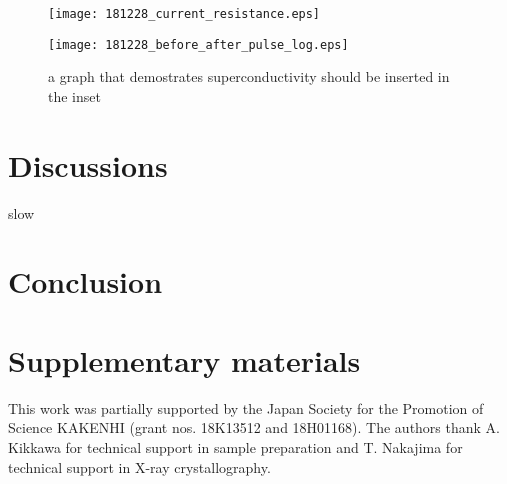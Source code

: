 \documentclass[aip,apl,reprint]{revtex4-1}
\begin{document}
\begin{figure}[!h]
    \begin{center}
   \texttt{[image: 181228\_current\_resistance.eps]}
  \end{center}
  \caption{}
  \label{fig:181228_current_resistance.eps}
\end{figure}

\begin{figure}[!h]
    \begin{center}
   \texttt{[image: 181228\_before\_after\_pulse\_log.eps]}
  \end{center}
  \caption{a graph that demostrates superconductivity should be inserted in the inset }
  \label{fig:181228_before_after_pulse_log}
\end{figure}

\section{Discussions}
slow\cite{oike}

\section{Conclusion}

\section{Supplementary materials}

\begin{acknowledgments}
This work was partially supported by the Japan Society for the Promotion of Science KAKENHI (grant nos. 18K13512 and 18H01168).
The authors thank A. Kikkawa for technical support in sample preparation and T. Nakajima for technical support in X-ray crystallography.
\end{acknowledgments}


\end{document}
